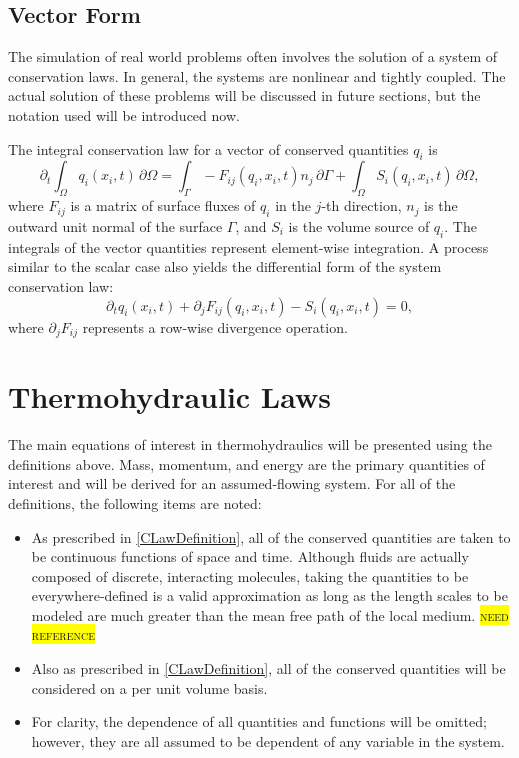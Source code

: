 \documentclass[Prelim,12pt]{WisconsinThesis}
\newcommand{\NeedReference}{\colorbox{yellow}{\textsc{need reference}}}
\newcommand{\pdt}   {\partial_t}
\newcommand{\pdj}   {\partial_j}
\newcommand{\V}     {\ensuremath{\Omega}}
\newcommand{\dV}    {\,\partial\V}
\newcommand{\IntV}  {\int_{\V}}
\renewcommand{\S}   {\ensuremath{\Gamma}}
\newcommand{\dS}    {\,\partial\S}
\newcommand{\IntS}  {\int_{\S}}
\newcommand{\qi}    {\ensuremath{q_i}}
\begin{document}
\subsection{Vector Form}
The simulation of real world problems often involves the solution of a system of conservation laws.
In general, the systems are nonlinear and tightly coupled.
The actual solution of these problems will be discussed in future sections, but the notation used will be introduced now.

The integral conservation law for a vector of conserved quantities \qi{} is
\begin{equation}%
    \pdt\!\IntV \qi(x_i,t) \dV = \IntS -F_{ij}(\qi,x_i,t) n_j\dS + \IntV S_i(\qi,x_i,t) \dV,
    \label{Eqn:GeneralIntegralCLawForSystems}
\end{equation}
where $F_{ij}$ is a matrix of surface fluxes of \qi{} in the $j$-th direction, $n_j$ is the outward unit normal of the surface \S{}, and $S_i$ is the volume source of \qi{}.
The integrals of the vector quantities represent element-wise integration.
A process similar to the scalar case also yields the differential form of the system conservation law:
\begin{equation}
    \pdt\qi(x_i,t) + \pdj F_{ij}(\qi,x_i,t) - S_i(\qi,x_i,t)  = 0,
    \label{Eqn:PreLimitGeneralIntegralCLawForSystems}
\end{equation}
where $\pdj F_{ij}$ represents a row-wise divergence operation.






\section{Thermohydraulic Laws}

The main equations of interest in thermohydraulics will be presented using the definitions above.
Mass, momentum, and energy are the primary quantities of interest and will be derived for an assumed-flowing system.
For all of the definitions, the following items are noted:
\begin{itemize}
    \item{
        As prescribed in \cref{CLawDefinition}, all of the conserved quantities are taken to be continuous functions of space and time.
        Although fluids are actually composed of discrete, interacting molecules, taking the quantities to be everywhere-defined is a valid approximation as long as the length scales to be modeled are much greater than the mean free path of the local medium.
        \NeedReference{}
    }
    \item{
        Also as prescribed in \cref{CLawDefinition}, all of the conserved quantities will be considered on a per unit volume basis.
    }
    \item{
        For clarity, the dependence of all quantities and functions will be omitted; however, they are all assumed to be dependent of any variable in the system.
    }
\end{itemize}
\end{document}
